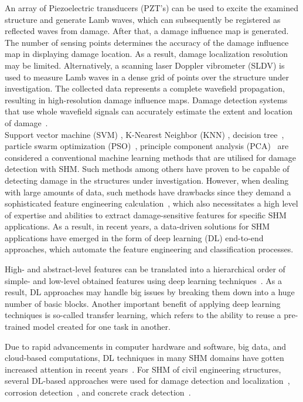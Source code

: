 An array of Piezoelectric transducers (PZT's) can be used to excite the examined structure and generate Lamb waves, which can subsequently be registered as reflected waves from damage.
After that, a damage influence map is generated.
The number of sensing points determines the accuracy of the damage influence map in displaying damage location.
As a result, damage localization resolution may be limited.
Alternatively, a scanning laser Doppler vibrometer  (SLDV) is used to measure Lamb waves in a dense grid of points over the structure under investigation.
The collected data represents a complete wavefield propagation, resulting in high-resolution damage influence maps.
Damage detection systems that use whole wavefield signals can accurately estimate the extent and location of damage~\cite{Girolamo2018a, kudela2018impact}.
\\
Support vector machine (SVM) \cite{noori2010application, Khoa2014, Ghiasi2016}, K-Nearest Neighbor (KNN) \cite{Vitola2017}, decision tree~\cite{Mariniello2020}, particle swarm optimization (PSO)~\cite{Khatir2018, NouriShirazi2014}, principle component analysis (PCA)~\cite{wang2014principal, nguyen2010fault, liu2014research} are considered a conventional machine learning methods that are utilised for damage detection with SHM.
Such methods among others have proven to be capable of detecting damage in the structures under investigation.
However, when dealing with large amounts of data, such methods have drawbacks since they demand a sophisticated feature engineering calculation~\cite{Gulgec2019}, which also necessitates a high level of expertise and abilities to extract damage-sensitive features for specific SHM applications.
As a result, in recent years, a data-driven solutions for SHM applications have emerged in the form of deep learning (DL) end-to-end approaches, which automate the feature engineering and classification processes.

High- and abstract-level features can be translated into a hierarchical order of simple- and low-level obtained features using deep learning techniques~\cite{goodfellow2016deep}.
As a result, DL approaches may handle big issues by breaking them down into a huge number of basic blocks.
Another important benefit of applying deep learning techniques is so-called transfer learning, which refers to the ability to reuse a pre-trained model created for one task in another.

Due to rapid advancements in computer hardware and software, big data, and cloud-based computations, DL techniques in many SHM domains have gotten increased attention in recent years~\cite{Azimi}.
For SHM of civil engineering structures, several DL-based approaches were used for damage detection and localization~\cite{Cha2018, Kong2018}, corrosion detection~\cite{Atha2018}, and concrete crack detection~\cite{Dung2019}.

